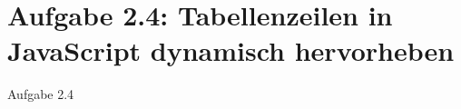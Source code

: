 \section{Aufgabe 2.4: Tabellenzeilen in JavaScript dynamisch hervorheben}
\begin{frame}{Aufgabe 2.4}
\end{frame}
